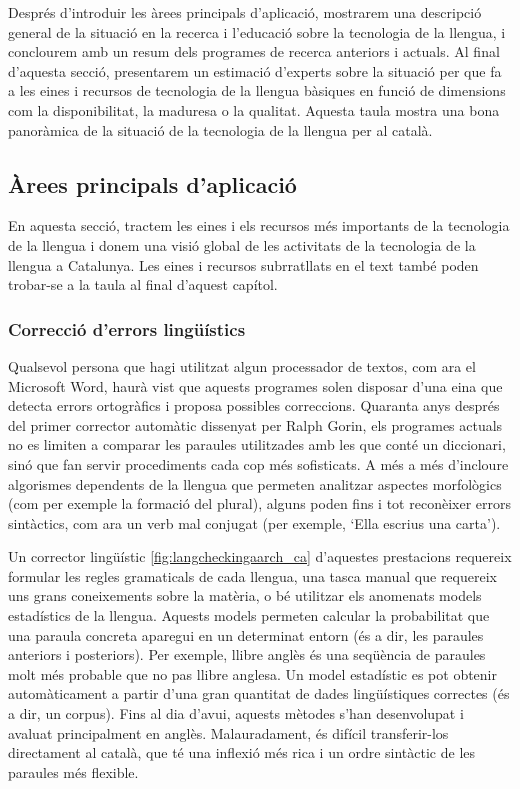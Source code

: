 \begin{multicols}{2}
Després d’introduir les àrees principals d’aplicació, mostrarem una descripció general de la situació en la recerca i l’educació sobre la tecnologia de la llengua, i conclourem amb un resum dels programes de recerca anteriors i actuals. Al final d’aquesta secció, presentarem un estimació d’experts sobre la situació per que fa a les eines i recursos de tecnologia de la llengua bàsiques en funció de dimensions com la disponibilitat, la maduresa o la qualitat. Aquesta taula mostra una bona panoràmica de la situació de la tecnologia de la llengua per al català.  

\subsection{Àrees principals d’aplicació} 

 En aquesta secció, tractem les eines i els recursos més importants de la tecnologia de la llengua i 
  donem una visió global de les activitats de la tecnologia de la llengua a Catalunya. Les eines i recursos subrratllats en el text també poden trobar-se a la taula al final d'aquest capítol.

\subsubsection{Correcció d’errors lingüístics}

Qualsevol persona que hagi utilitzat algun processador de textos, com ara el Microsoft Word, haurà vist que aquests programes solen disposar d’una eina que detecta errors ortogràfics i proposa possibles correccions. Quaranta anys després del primer corrector automàtic dissenyat per Ralph Gorin, els programes actuals no es limiten a comparar les paraules utilitzades amb les que conté un diccionari, sinó que fan servir procediments cada cop més sofisticats. A més a més d’incloure algorismes dependents de la llengua que permeten analitzar aspectes morfològics (com per exemple la formació del plural), alguns poden fins i tot reconèixer errors sintàctics, com ara un verb mal conjugat (per exemple, ‘Ella escrius una carta’).

Un corrector lingüístic \ref{fig:langcheckingaarch_ca} d'aquestes prestacions requereix formular les regles gramaticals de cada llengua, una tasca manual que requereix uns grans coneixements sobre la matèria, o bé utilitzar els anomenats models estadístics de la llengua. Aquests models permeten calcular la probabilitat que una paraula concreta aparegui en un determinat entorn (és a dir, les paraules anteriors i posteriors). Per exemple, llibre anglès és una seqüència de paraules molt més probable que no pas llibre anglesa. Un model estadístic es pot obtenir automàticament a partir d’una gran quantitat de dades lingüístiques correctes (és a dir, un corpus). Fins al dia d’avui, aquests mètodes s’han desenvolupat i avaluat principalment en anglès. Malauradament, és difícil transferir-los directament al català, que té una inflexió més rica i un ordre sintàctic de les paraules més flexible.


\end{multicols}
